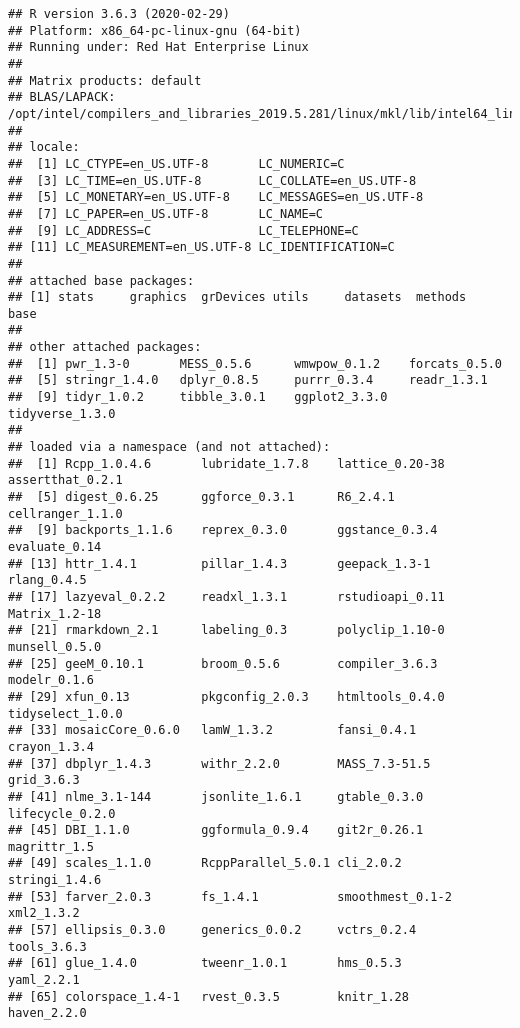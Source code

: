 \documentclass[]{article}
\begin{document}
\begin{verbatim}
## R version 3.6.3 (2020-02-29)
## Platform: x86_64-pc-linux-gnu (64-bit)
## Running under: Red Hat Enterprise Linux
## 
## Matrix products: default
## BLAS/LAPACK: /opt/intel/compilers_and_libraries_2019.5.281/linux/mkl/lib/intel64_lin/libmkl_gf_lp64.so
## 
## locale:
##  [1] LC_CTYPE=en_US.UTF-8       LC_NUMERIC=C              
##  [3] LC_TIME=en_US.UTF-8        LC_COLLATE=en_US.UTF-8    
##  [5] LC_MONETARY=en_US.UTF-8    LC_MESSAGES=en_US.UTF-8   
##  [7] LC_PAPER=en_US.UTF-8       LC_NAME=C                 
##  [9] LC_ADDRESS=C               LC_TELEPHONE=C            
## [11] LC_MEASUREMENT=en_US.UTF-8 LC_IDENTIFICATION=C       
## 
## attached base packages:
## [1] stats     graphics  grDevices utils     datasets  methods   base     
## 
## other attached packages:
##  [1] pwr_1.3-0       MESS_0.5.6      wmwpow_0.1.2    forcats_0.5.0  
##  [5] stringr_1.4.0   dplyr_0.8.5     purrr_0.3.4     readr_1.3.1    
##  [9] tidyr_1.0.2     tibble_3.0.1    ggplot2_3.3.0   tidyverse_1.3.0
## 
## loaded via a namespace (and not attached):
##  [1] Rcpp_1.0.4.6       lubridate_1.7.8    lattice_0.20-38    assertthat_0.2.1  
##  [5] digest_0.6.25      ggforce_0.3.1      R6_2.4.1           cellranger_1.1.0  
##  [9] backports_1.1.6    reprex_0.3.0       ggstance_0.3.4     evaluate_0.14     
## [13] httr_1.4.1         pillar_1.4.3       geepack_1.3-1      rlang_0.4.5       
## [17] lazyeval_0.2.2     readxl_1.3.1       rstudioapi_0.11    Matrix_1.2-18     
## [21] rmarkdown_2.1      labeling_0.3       polyclip_1.10-0    munsell_0.5.0     
## [25] geeM_0.10.1        broom_0.5.6        compiler_3.6.3     modelr_0.1.6      
## [29] xfun_0.13          pkgconfig_2.0.3    htmltools_0.4.0    tidyselect_1.0.0  
## [33] mosaicCore_0.6.0   lamW_1.3.2         fansi_0.4.1        crayon_1.3.4      
## [37] dbplyr_1.4.3       withr_2.2.0        MASS_7.3-51.5      grid_3.6.3        
## [41] nlme_3.1-144       jsonlite_1.6.1     gtable_0.3.0       lifecycle_0.2.0   
## [45] DBI_1.1.0          ggformula_0.9.4    git2r_0.26.1       magrittr_1.5      
## [49] scales_1.1.0       RcppParallel_5.0.1 cli_2.0.2          stringi_1.4.6     
## [53] farver_2.0.3       fs_1.4.1           smoothmest_0.1-2   xml2_1.3.2        
## [57] ellipsis_0.3.0     generics_0.0.2     vctrs_0.2.4        tools_3.6.3       
## [61] glue_1.4.0         tweenr_1.0.1       hms_0.5.3          yaml_2.2.1        
## [65] colorspace_1.4-1   rvest_0.3.5        knitr_1.28         haven_2.2.0
\end{verbatim}
\end{document}
